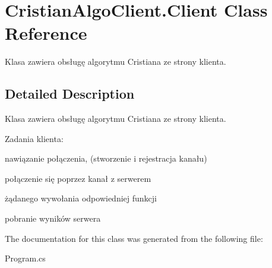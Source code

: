 \hypertarget{class_cristian_algo_client_1_1_client}{\section{Cristian\+Algo\+Client.\+Client Class Reference}
\label{class_cristian_algo_client_1_1_client}
}


Klasa zawiera obsługę algorytmu Cristiana ze strony klienta.  




\subsection{Detailed Description}
Klasa zawiera obsługę algorytmu Cristiana ze strony klienta. 

Zadania klienta\+:
\begin{DoxyItemize}
\item nawiązanie połączenia, (stworzenie i rejestracja kanału)
\item połączenie się poprzez kanał z serwerem
\item żądanego wywołania odpowiedniej funkcji
\item pobranie wyników serwera 
\end{DoxyItemize}

The documentation for this class was generated from the following file\+:\begin{DoxyCompactItemize}
\item 
Program.\+cs\end{DoxyCompactItemize}

